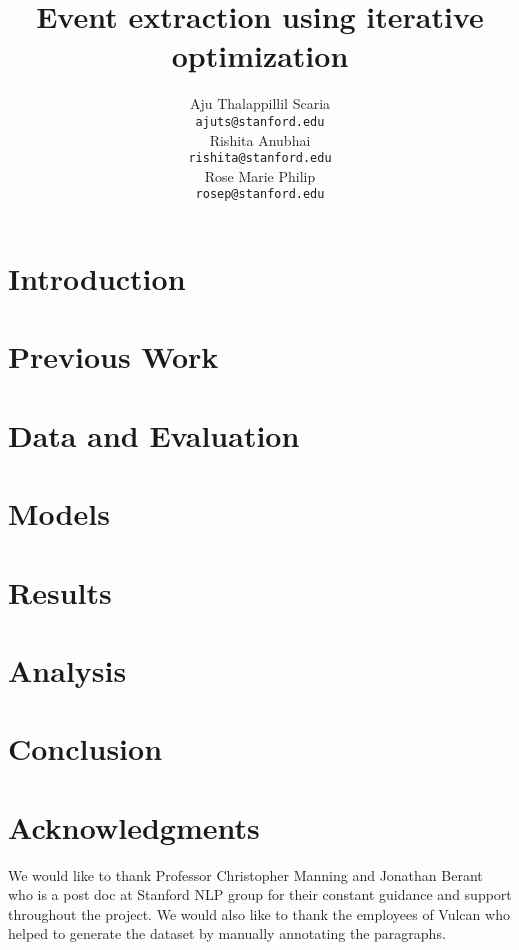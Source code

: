 \documentclass[11pt]{article}
\title{Event extraction using iterative optimization}
\author{
   Aju Thalappillil Scaria \\
  {\tt ajuts@stanford.edu} \\\And
  Rishita Anubhai \\
  {\tt rishita@stanford.edu} \\\And
  Rose Marie Philip \\
  {\tt rosep@stanford.edu} 
\\}
\date{}
\begin{document}
\maketitle
\begin{abstract}

\end{abstract}

\section{Introduction}
\label{sec:introduction}


\section{Previous Work}
\label{sec:previousapproaches}


\section{Data and Evaluation}
\label{sec:data}


\section{Models}
\label{sec:model}

\label{sec:model}

\label{sec:model}

\label{sec:model}

\label{sec:model}


\section{Results}
\label{sec:results}


\section{Analysis}
\label{sec:analysis}


\section{Conclusion}
\label{sec:conclusion}


\section*{Acknowledgments}
We would like to thank Professor Christopher Manning and Jonathan Berant who is a post doc at Stanford NLP group for their constant guidance and support throughout the project. We would also like to thank the employees of Vulcan who helped to generate the dataset by manually annotating the paragraphs.
\end{document}
